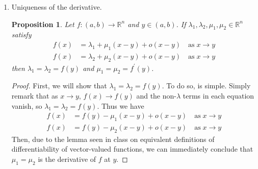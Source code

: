 \documentclass[letterpaper,11pt]{article}
\newtheorem{prop}{Proposition}
\newcommand{\R}{\mathbb{R}}
\newcommand{\as}[1]{\quad\text{as}\;#1}
\begin{document}
\begin{enumerate}
    \item Uniqueness of the derivative.

        \begin{prop}
            Let $f : (a, b) \to \R^n$ and $y \in (a, b)$. If
            $\lambda_1, \lambda_2, \mu_1, \mu_2 \in \R^n$ satisfy
            \begin{align}
                f(x) &= \lambda_1 + \mu_1(x-y) + o(x-y)\as{x \to y}
                \label{eq:uniqderiv1} \\
                f(x) &= \lambda_2 + \mu_2(x-y) + o(x-y)\as{x \to y}
                \label{eq:uniqderiv2}
            \end{align}
            then $\lambda_1 = \lambda_2 = f(y)$ and
            $\mu_1 = \mu_2 = f^\prime(y)$.
        \end{prop}

        \begin{proof}
            First, we will show that $\lambda_1 = \lambda_2 = f(y)$. To do so,
            is simple. Simply remark that as $x \to y$, $f(x) \to f(y)$ and the
            non-$\lambda$ terms in each equation vanish, so
            $\lambda_1 = \lambda_2 = f(y)$. Thus we have
            \begin{align*}
                f(x) &= f(y) - \mu_1(x-y) + o(x-y) \as{x \to y} \\
                f(x) &= f(y) - \mu_2(x-y) + o(x-y) \as{x \to y}
            \end{align*}
            Then, due to the lemma seen in class on equivalent definitions of
            differentiability of vector-valued functions, we can immediately
            conclude that $\mu_1 = \mu_2$ is the derivative of $f$ at $y$.
        \end{proof}
\end{enumerate}
\end{document}
